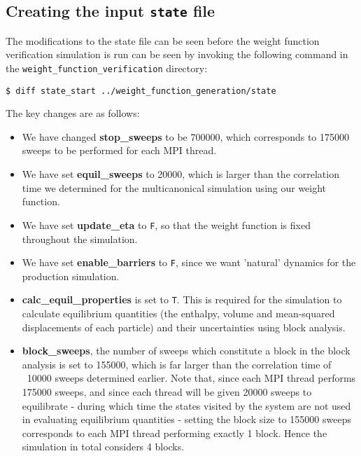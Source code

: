 \documentclass{report}
\begin{document}
\subsection{Creating the input \texttt{state} file}
The modifications to the state file can be seen before the weight function verification simulation is run can be seen by invoking the following command
in the \texttt{weight\_function\_verification} directory:
\begin{verbatim}
$ diff state_start ../weight_function_generation/state
\end{verbatim}
The key changes are as follows:
\begin{itemize}
\item We have changed \textbf{stop\_sweeps} to be 700000, which corresponds to 175000 sweeps to be performed for each MPI thread.
\item We have set \textbf{equil\_sweeps} to 20000, which is larger than the correlation time we determined for the multicanonical simulation using our 
weight function.
\item We have set \textbf{update\_eta} to \texttt{F}, so that the weight function is fixed throughout the simulation.
\item We have set \textbf{enable\_barriers} to \texttt{F}, since we want 'natural' dynamics for the production simulation.
\item \textbf{calc\_equil\_properties} is set to \texttt{T}. This is required for the simulation to calculate equilibrium quantities (the enthalpy, volume and 
mean-squared displacements of each particle) and their uncertainties using block analysis.
\item \textbf{block\_sweeps}, the number of sweeps which constitute a block in the block analysis is set to 155000, which is far larger than the 
correlation time of
  ~10000 sweeps determined earlier. Note that, since each MPI thread performs 175000 sweeps, and since each thread will be given 20000 sweeps to 
  equilibrate - during which time the states visited by the system are not used in evaluating equilibrium quantities - setting the block size to 
  155000 sweeps corresponds to each MPI thread performing exactly 1 block. Hence the simulation in total considers 4 blocks.
\end{itemize}
\end{document}
